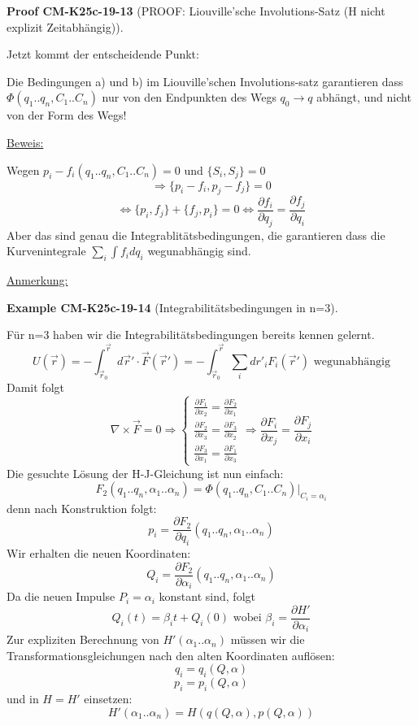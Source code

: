 \documentclass[10pt, letterpaper]{article}
\newcommand{\CustomHeading}[3]{%
  \par\medskip\noindent%
  \textbf{#1 #2} \textnormal{(#3)}.\enskip%
}
\newenvironment{EXA}[2]{\begin{unitbox}\CustomHeading{Example}{#1}{#2}}{\end{unitbox}}
\newenvironment{PROOF}[2]{\begin{unitbox}\CustomHeading{Proof}{#1}{#2}}{\end{unitbox}}
\begin{document}
\begin{PROOF}{CM-K25c-19-13}{PROOF: Liouville'sche Involutions-Satz (H nicht explizit Zeitabhängig)}
Jetzt kommt der entscheidende Punkt:

Die Bedingungen a) und b) im Liouville'schen Involutions-satz garantieren dass $\Phi(q_1..q_n,C_1..C_n)$ nur von den Endpunkten des Wegs $q_0 \rightarrow q$ abhängt, und nicht von der Form des Wegs!

\underline{Beweis:}

Wegen $p_i - f_i(q_1..q_n,C_1..C_n)=0$ und $\{S_i,S_j\}=0$
\[
\Rightarrow \{p_i-f_i, p_j-f_j\}=0
\]
\[
\Leftrightarrow \{p_i,f_j\} + \{f_j,p_i\}=0 \Leftrightarrow \frac{\partial f_i}{\partial q_j} = \frac{\partial f_j}{\partial q_i}
\]
Aber das sind genau die Integrablitätsbedingungen, die garantieren dass die Kurvenintegrale $\sum_i \int f_i dq_i$ wegunabhängig sind.
\end{PROOF}





\underline{Anmerkung:} 

\begin{EXA}{CM-K25c-19-14}{Integrabilitätsbedingungen in n=3}
Für n=3 haben wir die Integrabilitätsbedingungen bereits kennen gelernt.
\[
U(\vec{r}) = -\int_{\vec{r}_0}^{\vec{r}} d\vec{r}' \cdot \vec{F}(\vec{r}') = -\int_{\vec{r}_0}^{\vec{r}} \sum_i dr'_i F_i(\vec{r}') \text{ wegunabhängig}
\]
Damit folgt
\[
\nabla \times \vec{F} = 0 \Rightarrow 
\begin{cases}
\frac{\partial F_1}{\partial x_2} = \frac{\partial F_2}{\partial x_1} \\[1em]
\frac{\partial F_2}{\partial x_3} = \frac{\partial F_3}{\partial x_2} \\[1em]
\frac{\partial F_3}{\partial x_1} = \frac{\partial F_1}{\partial x_3}
\end{cases}
\Rightarrow \frac{\partial F_i}{\partial x_j} = \frac{\partial F_j}{\partial x_i}
\]
Die gesuchte Lösung der H-J-Gleichung ist nun einfach:
\[
F_2(q_1..q_n,\alpha_1..\alpha_n) = \Phi(q_1..q_n,C_1..C_n)\big|_{C_i=\alpha_i}
\]
denn nach Konstruktion folgt:
\[
p_i = \frac{\partial F_2}{\partial q_i}(q_1..q_n,\alpha_1..\alpha_n)
\]
Wir erhalten die neuen Koordinaten:
\[
Q_i = \frac{\partial F_2}{\partial \alpha_i}(q_1..q_n,\alpha_1..\alpha_n)
\]
Da die neuen Impulse $P_i = \alpha_i$ konstant sind, folgt
\[
Q_i(t) = \beta_i t + Q_i(0) \text{ wobei } \beta_i = \frac{\partial H'}{\partial \alpha_i}
\]
Zur expliziten Berechnung von $H'(\alpha_1..\alpha_n)$ müssen wir die Transformationsgleichungen nach den alten Koordinaten auflösen:
\[
q_i = q_i(Q,\alpha)
\]
\[
p_i = p_i(Q,\alpha)
\]
und in $H = H'$ einsetzen: 
$$H'(\alpha_1..\alpha_n) = H(q(Q,\alpha), p(Q,\alpha))$$
\end{EXA}
\end{document}
